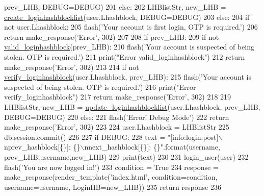 \begin{DoxyCode}
      prev\_LHB, DEBUG=DEBUG)
201             \textcolor{keywordflow}{else}:
202                 LHBlistStr, new\_LHB = \hyperlink{namespaceloginhashblock_a550707107141dfb228ca4294d7ea31b4}{create\_loginhashblocklist}(user.Lhashblock, 
      DEBUG=DEBUG)
203         \textcolor{keywordflow}{else}:
204             \textcolor{keywordflow}{if} \textcolor{keywordflow}{not} user.Lhashblock:
205                 flash(\textcolor{stringliteral}{'Your account is first login, OTP is required.'})
206                 \textcolor{keywordflow}{return} make\_response(\textcolor{stringliteral}{'Error'}, 302)
207 
208             \textcolor{keywordflow}{if} prev\_LHB:
209                 \textcolor{keywordflow}{if} \textcolor{keywordflow}{not} \hyperlink{namespaceloginhashblock_adb424539d851426da7b65d53c5a6d577}{valid\_loginhashblock}(prev\_LHB):
210                     flash(\textcolor{stringliteral}{'Your account is suspected of being stolen. OTP is required.'})
211                     print(\textcolor{stringliteral}{"Error valid\_loginhashblock"})
212                     \textcolor{keywordflow}{return} make\_response(\textcolor{stringliteral}{'Error'}, 302)
213 
214                 \textcolor{keywordflow}{if} \textcolor{keywordflow}{not} \hyperlink{namespaceloginhashblock_aa5bb94484a68d0bbebce23b4cfeeb4b7}{verify\_loginhashblock}(user.Lhashblock, prev\_LHB):
215                     flash(\textcolor{stringliteral}{'Your account is suspected of being stolen. OTP is required.'})
216                     print(\textcolor{stringliteral}{"Error verify\_loginhashblock"})
217                     \textcolor{keywordflow}{return} make\_response(\textcolor{stringliteral}{'Error'}, 302)
218 
219                 LHBlistStr, new\_LHB = \hyperlink{namespaceloginhashblock_a2bcc7ddd0fcc3788572dd77808cb624d}{update\_loginhashblocklist}(user.Lhashblock, 
      prev\_LHB, DEBUG=DEBUG)
220             \textcolor{keywordflow}{else}:
221                 flash(\textcolor{stringliteral}{'Error! Debug Mode'})
222                 \textcolor{keywordflow}{return} make\_response(\textcolor{stringliteral}{'Error'}, 302)
223 
224         user.Lhashblock = LHBlistStr
225         db.session.commit()
226 
227         \textcolor{keywordflow}{if} DEBUG:
228             text = \textcolor{stringliteral}{"[info:login:post]\(\backslash\)nprev\_hashblock[\{\}]: \{\}\(\backslash\)nnext\_hashblock[\{\}]: \{\}"}.format(username,
      prev\_LHB,username,new\_LHB)
229             print(text)
230 
231         login\_user(user)
232         flash(\textcolor{stringliteral}{'You are now logged in!'})
233         condition = \textcolor{keyword}{True}
234         response = make\_response(render\_template(\textcolor{stringliteral}{'index.html'}, condition=condition, username=username, 
      LoginHB=new\_LHB))
235         \textcolor{keywordflow}{return} response
236 
\end{DoxyCode}


